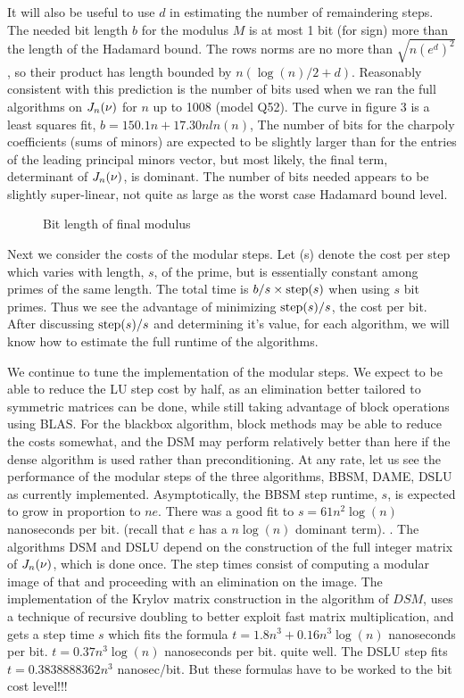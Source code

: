 \documentclass{acm_proc_article-sp}
\begin{document}
It will also be useful to use $d$ in estimating the number of remaindering steps.
The needed bit length $b$ for the modulus $M$ is at most 1 bit (for sign) more 
than the length of the Hadamard bound.  The rows norms are no more than \(\sqrt{n(e^d)^2}\),
so their product has length bounded by $n(\log(n)/2 + d)$.
Reasonably consistent with this prediction is the number of bits used when we ran
the full algorithms on $J_{n}({\nu})$ for $n$ up to 1008 (model Q52).  
The curve in figure 3 is a least squares fit,
$b = 150.1 n + 17.30n ln(n)$,
The number of bits for the charpoly coefficients (sums of minors) are expected 
to be slightly larger than for the entries of the  leading principal minors vector,
but most likely, the final term, determinant of $J_{n}({\nu})$, is dominant.  
The number of bits needed appears to be slightly super-linear, not quite as large as
the worst case Hadamard bound level.  
\begin{figure}[h] %
\caption{Bit length of final modulus}
\end{figure}

Next we consider the costs of the modular steps.
Let \step(s) denote the cost per step which varies with length, $s$, of the prime, 
but is essentially constant among primes of the same length.
The total time  is $b/s \times \mbox{step}(s)$ when using $s$ bit primes. 
Thus we see the advantage of minimizing $\mbox{step}(s)/s$, the cost per bit.
After discussing $\mbox{step}(s)/s$ and determining it's value, for each algorithm,  
we will know how to estimate the full runtime of the algorithms.

We continue to tune the implementation of the modular steps.
We expect to be able to reduce the LU step cost
by half, as an elimination better tailored to symmetric matrices can be done, while still taking
advantage of block operations using BLAS. For the blackbox algorithm, block methods may 
be able to reduce the costs somewhat, and the DSM may perform relatively better than
here if the dense \charpoly{} algorithm \cite{Pernet03} %
is used rather than preconditioning.
At any rate, let us see the performance of the modular steps of the three algorithms,
BBSM, DAME, DSLU as currently implemented.
Asymptotically, the BBSM step runtime, $s$, is expected to grow in
proportion to $ne$. There was a good fit to $s = 61 n^2\log(n)$ nanoseconds per bit.
(recall that $e$ has a $n\log(n)$ dominant term).
.
The algorithms DSM and DSLU depend on the construction of the full integer matrix of 
$J_{n}({\nu})$, which is done once.  The step times consist of computing a modular
image of that and proceeding with an elimination on the image.
The implementation of the Krylov matrix construction in the \minpoly{} algorithm of $DSM$,
uses a technique of recursive doubling to better exploit fast matrix multiplication,
and gets a step time $s$ which fits the formula 
$t = 1.8   n^3  + 0.16  n^3 \log(n)$ nanoseconds per bit.
$t = 0.37 n^3 \log(n)$ nanoseconds per bit.
quite well.  
The DSLU step fits 
$t = 0.3838888362 n^3$ nanosec/bit.
But these formulas have to be worked to the bit cost level!!!
\end{document}
